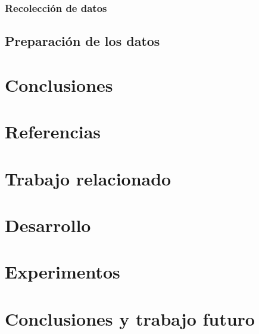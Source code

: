 \subsection{Recolección de datos}

\section{Preparación de los datos}

\chapter{Conclusiones}

\chapter{Referencias}


\chapter{Trabajo relacionado}

\chapter{Desarrollo}

\chapter{Experimentos}

\chapter{Conclusiones y trabajo futuro}